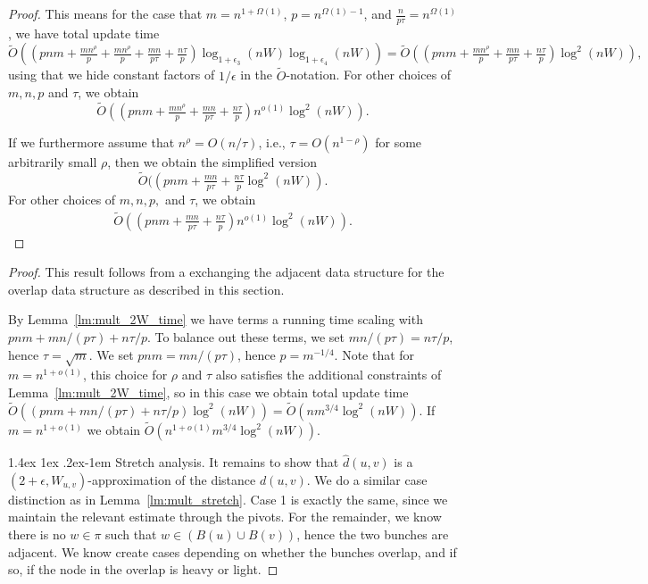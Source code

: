 \documentclass[11pt]{article}
\makeatletter
\theoremstyle{definition}
\theoremstyle{remark}
\renewcommand{\paragraph}{%
  \@startsection{paragraph}{4}%
  {\z@}{1.4ex \@plus 1ex \@minus .2ex}{-1em}%
  {\normalfont\normalsize\bfseries}%
}
\makeatother
\begin{document}
\begin{titlepage}
\begin{proof}
This means for the case that $m=n^{1+\Omega(1)}$, $p=n^{\Omega(1)-1}$, and $\tfrac{n}{p\tau}=n^{\Omega(1)}$, we have total update time
$$ \tilde O ((pnm + \tfrac{mn^\rho}{p}+\tfrac{mn^{\rho}}{p}  + \tfrac{m n }{p\tau}+\tfrac{n\tau}{ p})\log_{1+\epsilon_3}(nW)\log_{1+\epsilon_4}(nW)) = \tilde O ((pnm + \tfrac{mn^{\rho}}{p} + \tfrac{m n }{p\tau}+\tfrac{n\tau}{ p})\log^2(nW)), $$
using that we hide constant factors of $1/\epsilon$ in the $\tilde O$-notation. 
For other choices of $m,n,p$ and $\tau$, we obtain 
$$ \tilde O ((pnm + \tfrac{mn^{\rho}}{p} + \tfrac{m n }{p\tau}+\tfrac{n\tau}{ p})n^{o(1)}\log^2(nW)). $$

If we furthermore assume that $n^\rho = O(n/\tau)$, i.e., $\tau = O(n^{1-\rho})$ for some arbitrarily small $\rho$, then we obtain the simplified version
$$ \tilde O ((pnm +   \tfrac{m n }{p\tau}+\tfrac{n\tau}{ p}\log^2(nW)).$$
For other choices of $m,n,p,$ and $\tau$, we obtain 
\begin{align*}
     \tilde O ((pnm + \tfrac{m n }{p\tau}+\tfrac{n\tau}{ p})n^{o(1)}\log^2(nW)). 
\end{align*}
\end{proof}


    






\thmtwoW*
\begin{proof}
    This result follows from a exchanging the adjacent data structure for the overlap data structure as described in this section. 
    
    By Lemma~\ref{lm:mult_2W_time} we have terms a running time scaling with $pnm+mn/(p\tau)+n\tau/p$. To balance out these terms, we set $mn/(p\tau)=n\tau/p$, hence $\tau=\sqrt{m}$. We set $pnm = mn/(p\tau)$, hence $p=m^{-1/4}$. Note that for $m=n^{1+o(1)}$, this choice for $\rho$ and $\tau$ also satisfies the additional constraints of Lemma~\ref{lm:mult_2W_time}, so in this case we obtain total update time $\tilde O( (pnm+mn/(p\tau)+n\tau/p)\log^2(nW))= \tilde O (nm^{3/4}\log^2(nW))$. If $m=n^{1+o(1)}$ we obtain $\tilde O (n^{1+o(1)}m^{3/4}\log^2(nW))$.
    
    \paragraph{Stretch analysis.} It remains to show that $\hat d(u,v)$ is a $(2+\epsilon,W_{u,v})$-approximation of the distance $d(u,v)$. We do a similar case distinction as in Lemma~\ref{lm:mult_stretch}. Case 1 is exactly the same, since we maintain the relevant estimate through the pivots. For the remainder, we know there is no $w\in \pi$ such that $w\in (B(u)\cup B(v))$, hence the two bunches are adjacent. We know create cases depending on whether the bunches overlap, and if so, if the node in the overlap is heavy or light. 
    

\end{proof}
\end{titlepage}
\end{document}
